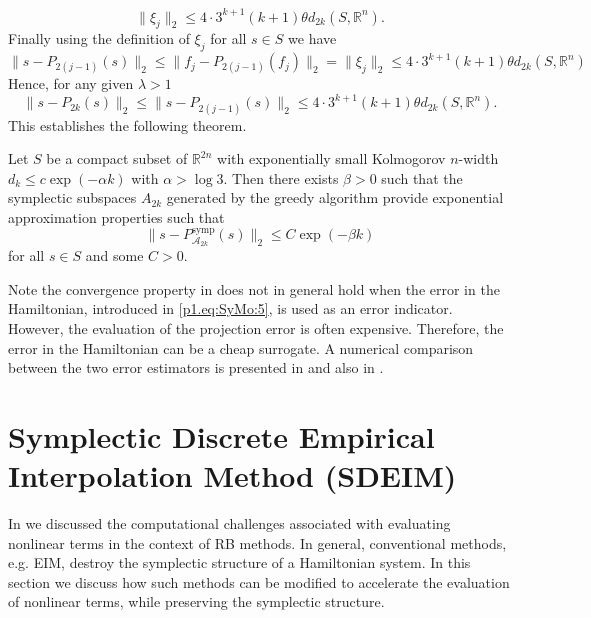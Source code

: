 \begin{equation} \label{eq:new20}
	\| \xi_j \|_2 \leq 4\cdot 3^{k+1} (k+1) \theta d_{2k}(S,\mathbb R^n).
\end{equation}
Finally using the definition of $\xi_j$ for all $s\in S$ we have
\begin{equation} \label{eq:new21}
	\| s - P_{2(j-1)}(s) \|_2 \leq \| f_j - P_{2(j-1)}(f_j) \|_2 = \|\xi_j \|_2 \leq 4\cdot 3^{k+1} (k+1) \theta d_{2k}(S,\mathbb R^n)
\end{equation}
Hence, for any given $\lambda > 1$
\begin{equation} \label{eq:new22}
	\| s - P_{2k}(s) \|_2 \leq \| s - P_{2(j-1)}(s) \|_2 \leq 4\cdot 3^{k+1} (k+1) \theta d_{2k}(S,\mathbb R^n).
\end{equation}
This establishes the following theorem.
\begin{theorem} \label{theorem:SyMo:2}
	Let $S$ be a compact subset of $\mathbb{R}^{2n}$ with exponentially small Kolmogorov $n$-width $d_{k}\leq c\exp(-\alpha k)$ with $\alpha > \log3$. Then there exists $\beta>0$ such that the symplectic subspaces $A_{2k}$ generated by the greedy algorithm provide exponential approximation properties such that
\begin{equation} \label{eq:new23}
	\| s - P^{\text{symp}}_{\mathcal A_{2k}}(s) \|_2 \leq C \exp(-\beta k)
\end{equation}
for all $s\in S$ and some $C>0$.
\end{theorem}

Note the convergence property in  does not in general hold when the error in the Hamiltonian, introduced in \eqref{p1.eq:SyMo:5}, is used as an error indicator. However, the evaluation of the projection error is often expensive. Therefore, the error in the Hamiltonian can be a cheap surrogate. A numerical comparison between the two error estimators is presented in  and also in \cite{Ripamonti:2017}.

\section{Symplectic Discrete Empirical Interpolation Method (SDEIM)} \label{sec:3.6}
In  we discussed the computational challenges associated with evaluating nonlinear terms in the context of RB methods. In general, conventional methods, e.g. EIM, destroy the symplectic structure of a Hamiltonian system. In this section we discuss how such methods can be modified to accelerate the evaluation of nonlinear terms, while preserving the symplectic structure.

